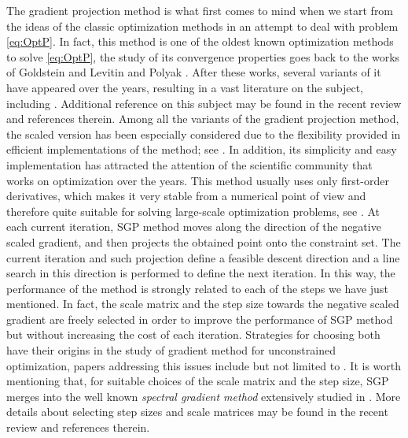 The  gradient projection method   is what first comes to mind when we start from the ideas of the classic optimization methods in an attempt to deal with problem \eqref{eq:OptP}.  In fact, this  method is one of the oldest known optimization methods to solve \eqref{eq:OptP}, the study of its convergence properties goes back to the works of Goldstein \cite{Goldstein1964} and Levitin and Polyak \cite{Polyak_Levitin1966}.  After these works, several variants of it have appeared over the years, resulting in a vast literature on the subject, including  \cite{yunier_roman2010, Bertsekas1976, Bertsekas1999, Fan_Wang_Yan2019, Figueiredo2007, Gong2011,   Iusem2003, Patrascu_Necoara2018, Zhang_Wang_Yang2019}. Additional reference on this subject  may be found in the recent  review  \cite{bonettini2019recent} and  references therein. Among all the variants of the gradient projection method, the scaled  version has been especially considered due to the flexibility provided in  efficient  implementations of the method; see \cite{BirginMartinezRaydan2003,10.1093/imanum/drh020,Bonettini2016, BonettiniPrato2015, Bonettini2009}.  In addition, its simplicity and easy implementation has attracted the attention of the scientific community that works on optimization over the years.  This method usually uses only first-order derivatives, which makes it very stable from a numerical point of view and therefore quite suitable for solving large-scale optimization problems, see \cite{More1990, Nesterov_Nemirovski2013, Sra_Nowozin_Wright2012, tang_golbabaee_davies2017}. At each current iteration, SGP method  moves along the direction of the negative scaled gradient, and then projects the obtained point  onto the constraint set.  
The current iteration and such projection define a feasible descent direction and a line search in this direction is performed to define the next iteration. In this way,  the performance of the method is strongly related to each of the steps we have just  mentioned. In fact, the scale matrix and the step size towards the negative scaled gradient are freely selected in order to improve the performance  of SGP method but without increasing the cost of each iteration.  Strategies  for choosing both have  their  origins in the study of  gradient  method  for unconstrained  optimization,   papers addressing  this issues include  but not limited to \cite{BB1988, BonettiniPrato2015, DaiFletcher2006,DaiHage2006, Serafino2018, Friedlander1999, Dai2006,  DaiFletcher2005,  Polyak_Levitin1966}.   It is worth mentioning that,  for suitable choices  of the scale matrix  and the  step size,  SGP merges into the well known {\it spectral gradient method}  extensively studied in \cite{BirginMartinezRaydan2003, spgsiam}.  More details  about selecting  step sizes and scale matrices  may be found in the recent  review  \cite{bonettini2019recent} and  references therein.

